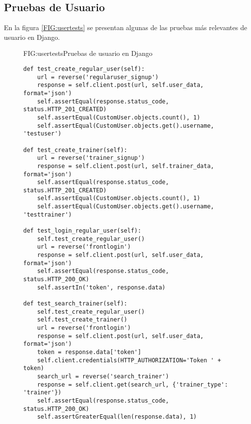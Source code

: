\newpage
\subsection{Pruebas de Usuario}
En la figura \ref{FIG:usertests} se presentan algunas de las pruebas más relevantes de usuario en Django.
\begin{figure}[Pruebas de Usuario]{FIG:usertests}{Pruebas de usuario en Django}
    \begin{verbatim}
def test_create_regular_user(self):
    url = reverse('regularuser_signup')
    response = self.client.post(url, self.user_data, format='json')
    self.assertEqual(response.status_code, status.HTTP_201_CREATED)
    self.assertEqual(CustomUser.objects.count(), 1)
    self.assertEqual(CustomUser.objects.get().username, 'testuser')

def test_create_trainer(self):
    url = reverse('trainer_signup')
    response = self.client.post(url, self.trainer_data, format='json')
    self.assertEqual(response.status_code, status.HTTP_201_CREATED)
    self.assertEqual(CustomUser.objects.count(), 1)
    self.assertEqual(CustomUser.objects.get().username, 'testtrainer')

def test_login_regular_user(self):
    self.test_create_regular_user()
    url = reverse('frontlogin')
    response = self.client.post(url, self.user_data, format='json')
    self.assertEqual(response.status_code, status.HTTP_200_OK)
    self.assertIn('token', response.data)

def test_search_trainer(self):
    self.test_create_regular_user()
    self.test_create_trainer()
    url = reverse('frontlogin')
    response = self.client.post(url, self.user_data, format='json')
    token = response.data['token']
    self.client.credentials(HTTP_AUTHORIZATION='Token ' + token)
    search_url = reverse('search_trainer')
    response = self.client.get(search_url, {'trainer_type': 'trainer'})
    self.assertEqual(response.status_code, status.HTTP_200_OK)
    self.assertGreaterEqual(len(response.data), 1)

    \end{verbatim}
    \end{figure}

\newpage

